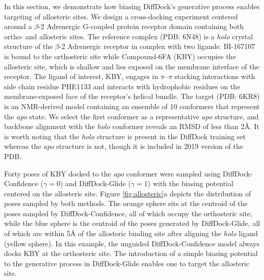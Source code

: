 \documentclass[letterpaper]{article}
\begin{document}
In this section, we demonstrate how biasing DiffDock's generative process enables targeting of allosteric sites. We design a cross-docking experiment centered around a $\beta$-2 Adrenergic G-coupled protein receptor domain containing both ortho- and allosteric sites. The reference complex (PDB: 6N48) is a \textit{holo} crystal structure of the $\beta$-2 Adrenergic receptor in complex with two ligands: BI-167107 is bound to the orthosteric site while Compound-6FA (KBY) occupies the allosteric site, which is shallow and lies exposed on the membrane interface of the receptor.\cite{liu2019mechanism} The ligand of interest, KBY, engages in $\pi$–$\pi$ stacking interactions with side chain residue PHE1133 and interacts with hydrophobic residues on the membrane-exposed face of the receptor’s helical bundle. The target (PDB: 6KR8) is an NMR-derived model containing an ensemble of 10 conformers that represent the \textit{apo} state.\cite{imai2020structural} We select the first conformer as a representative \textit{apo} structure, and  backbone alignment with the \textit{holo} conformer reveals an RMSD of less than 2{\AA}. It is worth noting that the \textit{holo} structure is present in the DiffDock training set whereas the \textit{apo} structure is not, though it is included in 2019 version of the PDB.

Forty poses of KBY docked to the \textit{apo} conformer were sampled using DiffDock-Confidence ($\gamma=0$) and DiffDock-Glide ($\gamma=1$) with the biasing potential centered on the allosteric site. Figure \ref{fig:allosteric}a depicts the distribution of poses sampled by both methods. The orange sphere sits at the centroid of the poses sampled by DiffDock-Confidence, all of which occupy the orthosteric site, while the blue sphere is the centroid of the poses generated by DiffDock-Glide, all of which are within 5{\AA} of the allosteric binding site after aligning the \textit{holo} ligand (yellow sphere). In this example, the unguided DiffDock-Confidence model always docks KBY at the orthosteric site. The introduction of a simple biasing potential to the generative process in DiffDock-Glide enables one to target the allosteric site.
\end{document}
